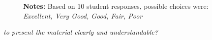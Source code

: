 \begin{boenumerate}
\begin{itemize}
\begin{figure}[h!]\centering
{}\hspace{0.75cm}
\begin{center}
\begin{minipage}[t]{0.85\columnwidth}\vspace{-0.75cm}
\item\scriptsize{\textbf{Notes:} Based on 10 student responses, possible choices were: \emph{Excellent, Very Good, Good, Fair, Poor} }
\end{minipage}
\end{center}
\end{figure}

\item \textit{to present the material clearly and understandable?}


\end{itemize}
\end{boenumerate}
